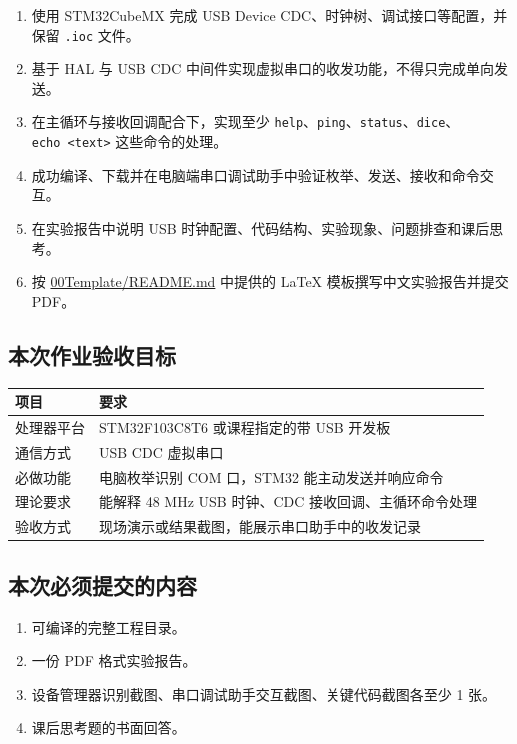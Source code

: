 \documentclass[
  chinese,
  UTF8,
  oneside,
  openany]{ctexbook}
\providecommand{\tightlist}{%
  \setlength{\itemsep}{0pt}\setlength{\parskip}{0pt}}
\begin{document}
\begin{enumerate}
\def\labelenumi{\arabic{enumi}.}
\tightlist
\item
  使用 STM32CubeMX 完成 USB Device CDC、时钟树、调试接口等配置，并保留
  \texttt{.ioc} 文件。
\item
  基于 HAL 与 USB CDC 中间件实现虚拟串口的收发功能，不得只完成单向发送。
\item
  在主循环与接收回调配合下，实现至少
  \texttt{help}、\texttt{ping}、\texttt{status}、\texttt{dice}、\texttt{echo\ \textless{}text\textgreater{}}
  这些命令的处理。
\item
  成功编译、下载并在电脑端串口调试助手中验证枚举、发送、接收和命令交互。
\item
  在实验报告中说明 USB
  时钟配置、代码结构、实验现象、问题排查和课后思考。
\item
  按 \href{../00Template/README.md}{00Template/README.md} 中提供的 LaTeX
  模板撰写中文实验报告并提交 PDF。
\end{enumerate}

\subsection{本次作业验收目标}\label{ux672cux6b21ux4f5cux4e1aux9a8cux6536ux76eeux6807-3}

\begin{longtable}[]{@{}ll@{}}
\toprule\noalign{}
项目 & 要求 \\
\midrule\noalign{}
\endhead
\bottomrule\noalign{}
\endlastfoot
处理器平台 & STM32F103C8T6 或课程指定的带 USB 开发板 \\
通信方式 & USB CDC 虚拟串口 \\
必做功能 & 电脑枚举识别 COM 口，STM32 能主动发送并响应命令 \\
理论要求 & 能解释 48 MHz USB 时钟、CDC 接收回调、主循环命令处理 \\
验收方式 & 现场演示或结果截图，能展示串口助手中的收发记录 \\
\end{longtable}

\subsection{本次必须提交的内容}\label{ux672cux6b21ux5fc5ux987bux63d0ux4ea4ux7684ux5185ux5bb9-3}

\begin{enumerate}
\def\labelenumi{\arabic{enumi}.}
\tightlist
\item
  可编译的完整工程目录。
\item
  一份 PDF 格式实验报告。
\item
  设备管理器识别截图、串口调试助手交互截图、关键代码截图各至少 1 张。
\item
  课后思考题的书面回答。
\end{enumerate}
\end{document}
